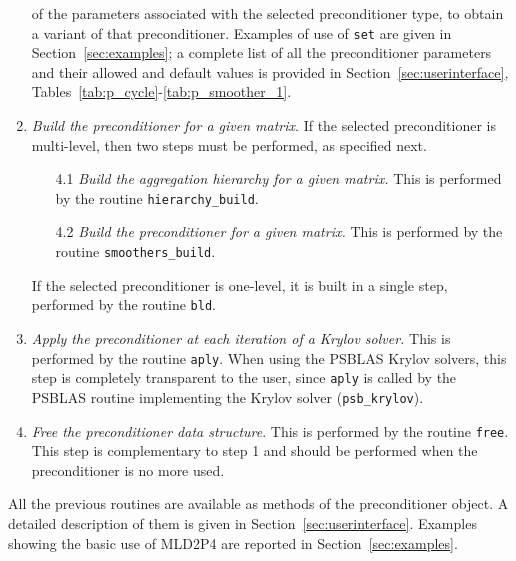 \begin{enumerate}
  of the parameters associated with the selected preconditioner type, to obtain a variant
  of that preconditioner. Examples of use of \verb|set| are given in
  Section~\ref{sec:examples}; a complete list of all the
  preconditioner parameters and their allowed and default values is provided in 
  Section~\ref{sec:userinterface}, Tables~\ref{tab:p_cycle}-\ref{tab:p_smoother_1}.
\item \emph{Build the preconditioner for a given matrix}. If the selected preconditioner
 is multi-level, then two steps must be performed, as specified next.
\begin{enumerate}
\item[4.1] \emph{Build the aggregation hierarchy for a given matrix.} This is
performed by the routine \verb|hierarchy_build|.
\item[4.2] \emph{Build the preconditioner for a given matrix.} This is performed
by the routine \verb|smoothers_build|.
\end{enumerate}
 If the selected preconditioner is one-level, it is built in a single step,
performed by the routine \verb|bld|.
\item \emph{Apply the preconditioner at each iteration of a Krylov solver.}
  This is performed by the routine \verb|aply|. When using the PSBLAS Krylov solvers,
  this step is completely transparent to the user, since \verb|aply| is called
  by the PSBLAS routine implementing the Krylov solver (\verb|psb_krylov|).
\item \emph{Free the preconditioner data structure}. This is performed by
  the routine \verb|free|. This step is complementary to step 1 and should
  be performed when the preconditioner is no more used.
\end{enumerate}

All the previous routines are available as methods of the preconditioner object.
A detailed description of them is given in Section~\ref{sec:userinterface}.
Examples showing the basic use of MLD2P4 are reported in Section~\ref{sec:examples}.

